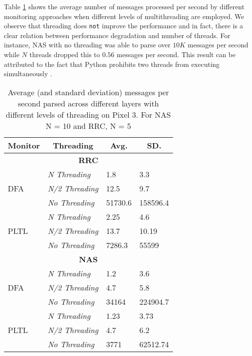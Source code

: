 Table \ref{tab:threading_pixel_3} shows the average number of messages
processed per second by different monitoring approaches when different
levels of multithreading are employed. We observe that threading does \texttt{not}
improve the performance and in fact, there is a clear relation between
performance degradation and number of threads. For instance, NAS with no threading
was able to parse over $10K$ messages per second while $N$ threads dropped this
to $0.56$ messages per second. This result can be attributed to the fact that Python
prohibits two threads from executing simultaneously \cite{python_threading}.

\begin{table}[]
  \centering
  \begin{tabular}{|l|l|l|l|}
  \hline
  \multicolumn{1}{|c|}{\textbf{Monitor}} & \multicolumn{1}{c|}{\textbf{Threading}} & \multicolumn{1}{c|}{\textbf{Avg.}} & \multicolumn{1}{c|}{\textbf{SD.}} \\ \hline
  \multicolumn{4}{|c|}{\textbf{RRC}} \\ \hline
  \multirow{3}{*}{DFA} & \textit{N Threading} & 1.8 & 3.3 \\ \cline{2-4}
   & \textit{N/2 Threading} & 12.5 & 9.7 \\ \cline{2-4}
   & \textit{No Threading} & 51730.6 & 158596.4 \\ \hline
  \multirow{3}{*}{PLTL} & \textit{N Threading} & 2.25 & 4.6 \\ \cline{2-4}
   & \textit{N/2 Threading} & 13.7 & 10.19 \\ \cline{2-4}
   & \textit{No Threading} & 7286.3 & 55599 \\ \hline
  \multicolumn{4}{|c|}{\textbf{NAS}} \\ \hline
  \multirow{3}{*}{DFA} & \textit{N Threading} & 1.2 & 3.6 \\ \cline{2-4}
   & \textit{N/2 Threading} & 4.7 & 5.8 \\ \cline{2-4}
   & \textit{No Threading} & 34164 & 224904.7 \\ \hline
  \multirow{3}{*}{PLTL} & \textit{N Threading} & 1.23 & 3.73 \\ \cline{2-4}
   & \textit{N/2 Threading} & 4.7 & 6.2 \\ \cline{2-4}
   & \textit{No Threading} & 3771 & 62512.74 \\ \hline
  \end{tabular}
\caption{Average (and standard deviation) messages per second parsed across different layers with different levels of threading on Pixel 3. For NAS N = 10 and RRC, N = 5}
\label{tab:threading_pixel_3}
\end{table}

